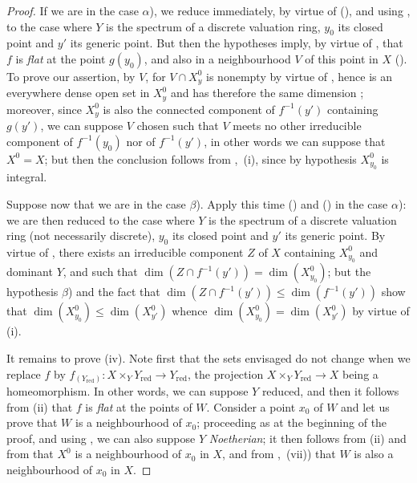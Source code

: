 \begin{proof}
If we are in the case $\alpha$), we reduce immediately, by virtue of (), and using , to the case where $Y$ is the spectrum of a discrete valuation ring, $y_0$ its closed point and $y'$ its generic point.
But then the hypotheses imply, by virtue of , that $f$ is \emph{flat} at the point $g(y_0)$, and also in a neighbourhood $V$ of this point in $X$ ().
To prove our assertion, by $V$, for $V\cap X_y^0$ is nonempty by virtue of , hence is an everywhere dense open set in $X_y^0$ and has therefore the same dimension ; moreover, since $X_y^0$ is also the connected component of $f^{-1}(y')$ containing $g(y')$, we can suppose $V$ chosen such that $V$ meets no other irreducible component of $f^{-1}(y_0)$ nor of $f^{-1}(y')$, in other words we can suppose that $X^0=X$; but then the conclusion follows from ,~(i), since by hypothesis $X_{y_0}^0$ is integral.

Suppose now that we are in the case $\beta$).
Apply this time () and () in the case $\alpha$): we are then reduced to the case where $Y$ is the spectrum of a discrete valuation ring (not necessarily discrete), $y_0$ its closed point and $y'$ its generic point.
By virtue of , there exists an irreducible component $Z$ of $X$ containing $X_{y_0}^0$ and dominant $Y$, and such that $\dim(Z\cap f^{-1}(y'))=\dim(X_{y_0}^0)$; but the hypothesis $\beta$) and the fact that $\dim(Z\cap f^{-1}(y'))\leq\dim(f^{-1}(y'))$ show that $\dim(X_{y_0}^0)\leq\dim(X_{y'}^0)$ whence $\dim(X_{y_0}^0)=\dim(X_{y'}^0)$ by virtue of (i).

It remains to prove (iv).
Note first that the sets envisaged do not change when we replace $f$ by $f_{(Y_\mathrm{red})}:X\times_Y Y_\mathrm{red}\to Y_\mathrm{red}$, the projection $X\times_Y Y_\mathrm{red}\to X$ being a homeomorphism.
In other words, we can suppose $Y$ reduced, and then it follows from (ii) that $f$ is \emph{flat} at the points of $W$.
Consider a point $x_0$ of $W$ and let us prove that $W$ is a neighbourhood of $x_0$; proceeding as at the beginning of the proof, and using , we can also suppose $Y$ \emph{Noetherian}; it then follows from (ii) and from  that $X^0$ is a neighbourhood of $x_0$ in $X$, and from ,~(vii)) that $W$ is also a neighbourhood of $x_0$ in $X$.
\end{proof}

